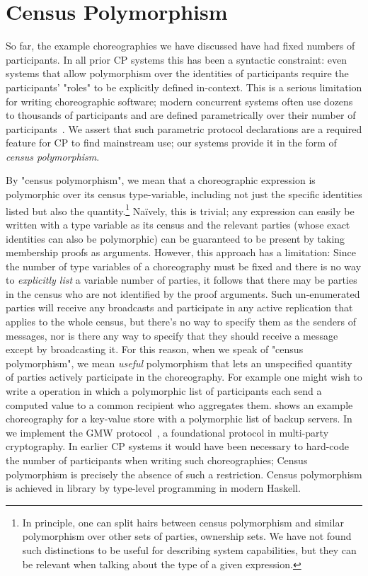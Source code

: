 \section{Census Polymorphism}
\label{sec:census-poly}

So far, the example choreographies we have discussed have had fixed numbers of participants.
In all prior CP systems this has been a syntactic constraint:
even systems that allow polymorphism over the identities of participants require the participants' "roles" to be explicitly defined in-context.
This is a serious limitation for writing choreographic software;
modern concurrent systems often use dozens to thousands of participants
and are defined parametrically over their number of participants~\cite{bigConcurrent1, corrigan2017prio, bigConcurrent3, bigConcurrent4, dprio2023}.
We assert that such parametric protocol declarations are a required feature for CP to find mainstream use;
our systems provide it in the form of \emph{census polymorphism}.

By "census polymorphism", we mean that a choreographic expression is polymorphic over its census type-variable,
including not just the specific identities listed but also the quantity.\footnote{
    In principle, one can split hairs between census polymorphism and similar polymorphism over other sets of parties, \eg ownership sets.
    We have not found such distinctions to be useful for describing system capabilities,
    but they can be relevant when talking about the type of a given expression.
}
Naïvely, this is trivial; any \MultiChor expression can easily be written with a type variable as its census
and the relevant parties (whose exact identities can also be polymorphic) can be guaranteed to be present by taking
membership proofs as arguments.
However, this approach has a limitation: Since the number of type variables of a choreography must be fixed
and there is no way to \emph{explicitly list} a variable number of parties,
it follows that there may be parties in the census who are not identified by the proof arguments.
Such un-enumerated parties will receive any broadcasts and participate in any active replication that applies to the whole census,
but there's no way to specify them as the senders of messages, nor is there any way to specify that they should receive a message
except by broadcasting it.
For this reason, when we speak of "census polymorphism",
we mean \emph{useful} polymorphism that lets an unspecified quantity of parties actively participate in the choreography.
For example one might wish to write a  operation
in which a polymorphic list of participants each send a computed value to a common recipient who aggregates them.
 shows an example \MultiChor choreography for a key-value store with a polymorphic list of backup servers.
In  we implement the GMW protocol~\cite{goldreich2019play}, a foundational protocol in multi-party cryptography.
In earlier CP systems it would have been necessary to hard-code the number of participants when writing such choreographies;
Census polymorphism is precisely the absence of such a restriction.
Census polymorphism is achieved in \MultiChor library by type-level programming in modern Haskell.

